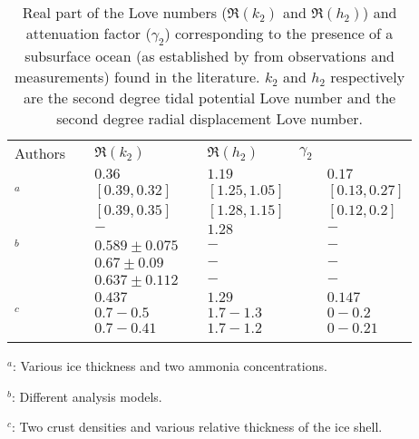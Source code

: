 \begin{table}
\centering
\begin{threeparttable}
\caption{Real part of the Love numbers ($\Re(k_2)$ and $\Re(h_2)$) and attenuation factor ($\gamma_2$) corresponding to the presence of a subsurface ocean (as established by \citet{sohl2003interior, sohl2014structural, baland2014titan, lefevre2014structure, beuthe2015tidal} from observations and measurements) found in the literature. $k_2$ and $h_2$ respectively are the second degree tidal potential Love number and the second degree radial displacement Love number. \label{tab:intro:gamma}}
\begin{tabular}{lllllll} \hline\noalign{\smallskip}

{Authors}&{}&{$\Re(k_2)$}&{}& {$\Re(h_2)$}&{$\gamma_2$} \\ \noalign{\smallskip}\hline\noalign{\smallskip}
 {\citet{sohl1995tidal}}&{} &{$0.36$}&{}&{$1.19$}&{}& {$0.17$} \\ 
{\citet{sohl2003interior}$^a$}&{} &{$[0.39,0.32]$}&{}&{$[1.25,1.05]$}&{}& {$[0.13,0.27]$} \\ 
{}&{} &{$[0.39,0.35]$}&{}&{$[1.28,1.15]$}&{}& {$[0.12,0.2]$}\\ 
{\citet{nimmo2010shell}}&{} &{$-$}&{}&{$1.28$}&{}& {$-$}\\ 
{\citet{iess2012tides}$^b$}&{} &{$0.589\pm0.075$}&{}&{$-$}&{}& {$-$}\\ 
{}&{} &{$0.67\pm0.09 $}&{}&{$-$}&{}& {$-$} \\ 
{}&{} &{$0.637\pm0.112 $}&{}&{$-$}&{}& {$-$} \\
{\citet{sohl2014structural}}&{} &{$0.437$}&{}&{$1.29$}&{}& {$0.147$}\\
{\citet{beuthe2015tidal}$^c$}&{} &{$0.7-0.5$}&{}&{$1.7-1.3$}&{}& {$0-0.2$}\\
{}&{} &{$0.7-0.41$}&{}&{$1.7-1.2$}&{}& {$0-0.21$}
 \\\noalign{\smallskip}\hline
\end{tabular}
\begin{tablenotes}
\small
\item $^a$: Various ice thickness and two ammonia concentrations.
\item $^b$: Different analysis models.
\item $^c$: Two crust densities and various relative thickness of the ice shell.
\end{tablenotes}
\end{threeparttable}
\end{table}

